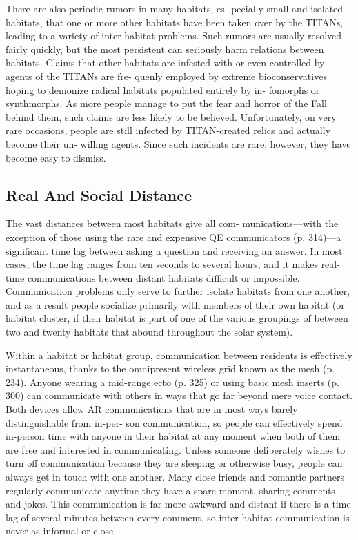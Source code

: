 There are also periodic rumors in many habitats, es-
pecially small and isolated habitats, that one or more 
other habitats have been taken over by the TITANs, 
leading to a variety of inter-habitat problems. Such 
rumors are usually resolved fairly quickly, but the 
most persistent can seriously harm relations between 
habitats. Claims that other habitats are infested with 
or even controlled by agents of the TITANs are fre-
quenly employed by extreme bioconservatives hoping 
to demonize radical habitats populated entirely by in-
fomorphs or synthmorphs. As more people manage to 
put the fear and horror of the Fall behind them, such 
claims are less likely to be believed. Unfortunately, 
on very rare occasions, people are still infected by 
TITAN-created relics and actually become their un-
willing agents. Since such incidents are rare, however, 
they have become easy to dismiss.

\subsection{Real And Social Distance}

The vast distances between most habitats give all com-
munications—with the exception of those using the 
rare and expensive QE communicators (p. 314)—a 
significant time lag between asking a question and 
receiving an answer. In most cases, the time lag ranges 
from ten seconds to several hours, and it makes real-
time communications between distant habitats difficult 
or impossible. Communication problems only serve to 
further isolate habitats from one another, and as a result 
people socialize primarily with members of their own 
habitat (or habitat cluster, if their habitat is part of one 
of the various groupings of between two and twenty 
habitats that abound throughout the solar system).

Within a habitat or habitat group, communication 
between residents is effectively instantaneous, thanks 
to the omnipresent wireless grid known as the mesh 
(p. 234). Anyone wearing a mid-range ecto (p. 325) 
or using basic mesh inserts (p. 300) can communicate 
with others in ways that go far beyond mere voice 
contact. Both devices allow AR communications that 
are in most ways barely distinguishable from in-per-
son communication, so people can effectively spend 
in-person time with anyone in their habitat at any 
moment when both of them are free and interested in 
communicating. Unless someone deliberately wishes 
to turn off communication because they are sleeping 
or otherwise busy, people can always get in touch 
with one another. Many close friends and romantic 
partners regularly communicate anytime they have 
a spare moment, sharing comments and jokes. This 
communication is far more awkward and distant if 
there is a time lag of several minutes between every 
comment, so inter-habitat communication is never as 
informal or close.

